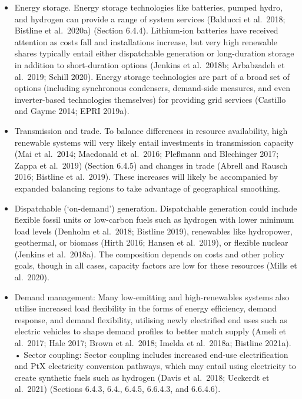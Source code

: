 \documentclass[
  letterpaper,
  DIV=11,
  numbers=noendperiod]{scrreprt}
\providecommand{\tightlist}{%
  \setlength{\itemsep}{0pt}\setlength{\parskip}{0pt}}\usepackage{longtable,booktabs,array}
\begin{document}
\begin{itemize}
\tightlist
\item
  Energy storage. Energy storage technologies like batteries, pumped
  hydro, and hydrogen can provide a range of system services (Balducci
  et al.~2018; Bistline et al.~2020a) (Section 6.4.4). Lithium-ion
  batteries have received attention as costs fall and installations
  increase, but very high renewable shares typically entail either
  dispatchable generation or long-duration storage in addition to
  short-duration options (Jenkins et al.~2018b; Arbabzadeh et al.~2019;
  Schill 2020). Energy storage technologies are part of a broad set of
  options (including synchronous condensers, demand-side measures, and
  even inverter-based technologies themselves) for providing grid
  services (Castillo and Gayme 2014; EPRI 2019a).
\item
  Transmission and trade. To balance differences in resource
  availability, high renewable systems will very likely entail
  investments in transmission capacity (Mai et al.~2014; Macdonald et
  al.~2016; Pleßmann and Blechinger 2017; Zappa et al.~2019) (Section
  6.4.5) and changes in trade (Abrell and Rausch 2016; Bistline et
  al.~2019). These increases will likely be accompanied by expanded
  balancing regions to take advantage of geographical smoothing.
\item
  Dispatchable (`on-demand') generation. Dispatchable generation could
  include flexible fossil units or low-carbon fuels such as hydrogen
  with lower minimum load levels (Denholm et al.~2018; Bistline 2019),
  renewables like hydropower, geothermal, or biomass (Hirth 2016; Hansen
  et al.~2019), or flexible nuclear (Jenkins et al.~2018a). The
  composition depends on costs and other policy goals, though in all
  cases, capacity factors are low for these resources (Mills et
  al.~2020).
\item
  Demand management: Many low-emitting and high-renewables systems also
  utilise increased load flexibility in the forms of energy efficiency,
  demand response, and demand flexibility, utilising newly electrified
  end uses such as electric vehicles to shape demand profiles to better
  match supply (Ameli et al.~2017; Hale 2017; Brown et al.~2018; Imelda
  et al.~2018a; Bistline 2021a). • Sector coupling: Sector coupling
  includes increased end-use electrification and PtX electricity
  conversion pathways, which may entail using electricity to create
  synthetic fuels such as hydrogen (Davis et al.~2018; Ueckerdt et
  al.~2021) (Sections 6.4.3, 6.4., 6.4.5, 6.6.4.3, and 6.6.4.6).
\end{itemize}
\end{document}
